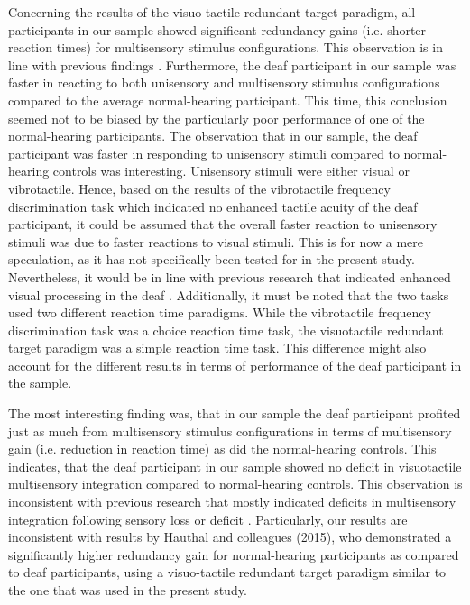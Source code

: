 \documentclass[12pt]{article}
\begin{document}
\par Concerning the results of the visuo-tactile redundant target paradigm, all participants in our sample showed significant redundancy gains (i.e. shorter reaction times) for multisensory stimulus configurations. This observation is in line with previous findings \parencite{diederich_bimodal_2004,hershenson_reaction_1962,miller_divided_1982}. Furthermore, the deaf participant in our sample was faster in reacting to both unisensory and multisensory stimulus configurations compared to the average normal-hearing participant. This time, this conclusion seemed not to be biased by the particularly poor performance of one of the normal-hearing participants. The observation that in our sample, the deaf participant was faster in responding to unisensory stimuli compared to normal-hearing controls was interesting. Unisensory stimuli were either visual or vibrotactile. Hence, based on the results of the vibrotactile frequency discrimination task which indicated no enhanced tactile acuity of the deaf participant, it could be assumed that the overall faster reaction to unisensory stimuli was due to faster reactions to visual stimuli. This is for now a mere speculation, as it has not specifically been tested for in the present study. Nevertheless, it would be in line with previous research that indicated enhanced visual processing in the deaf \parencite{proksch_changes_2002}. Additionally, it must be noted that the two tasks used two different reaction time paradigms. While the vibrotactile frequency discrimination task was a choice reaction time task, the visuotactile redundant target paradigm was a simple reaction time task. This difference might also account for the different results in terms of performance of the deaf participant in the sample. 
\par The most interesting finding was, that in our sample the deaf participant profited just as much from multisensory stimulus configurations in terms of multisensory gain (i.e. reduction in reaction time) as did the normal-hearing controls. This indicates, that the deaf participant in our sample showed no deficit in visuotactile multisensory integration compared to normal-hearing controls. This observation is inconsistent with previous research that mostly indicated deficits in multisensory integration following sensory loss or deficit \parencite{champoux_early-_2011,occelli_audiotactile_2012,hotting_hearing_2004,landry_temporary_2013}. Particularly, our results are inconsistent with results by Hauthal and colleagues (2015), who demonstrated a significantly higher redundancy gain for normal-hearing participants as compared to deaf participants, using a visuo-tactile redundant target paradigm similar to the one that was used in the present study. 
\end{document}
